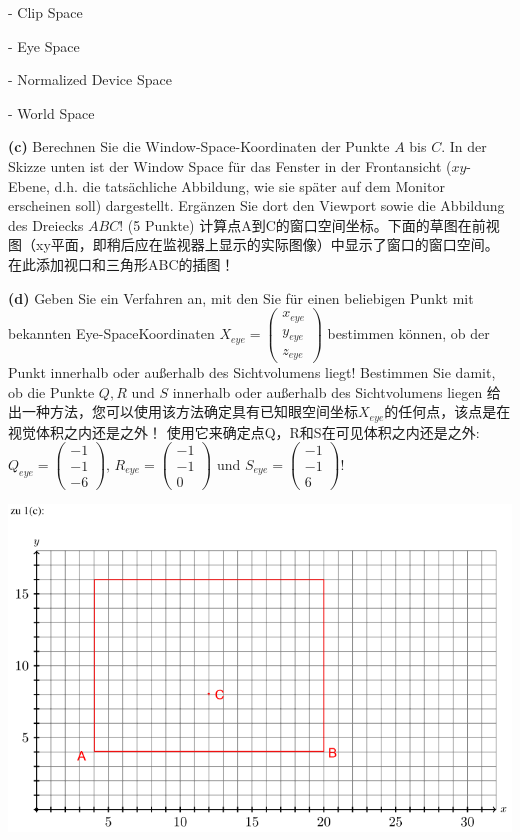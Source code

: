 \documentclass[fleqn]{article}
\begin{document}
\indent\indent - Clip Space 

\indent\indent - Eye Space 

\indent\indent - Normalized Device Space 

\indent\indent - World Space

\indent\textbf{(c)} Berechnen Sie die Window-Space-Koordinaten der Punkte $A$ bis $C$.
 In der Skizze unten ist der Window Space für das Fenster in der Frontansicht ($xy$-Ebene, 
 d.h. die tatsächliche Abbildung, wie sie später auf dem Monitor erscheinen soll) dargestellt. Ergänzen Sie dort den Viewport sowie die Abbildung des Dreiecks $ABC$! (5 Punkte)
 计算点A到C的窗口空间坐标。下面的草图在前视图（xy平面，即稍后应在监视器上显示的实际图像）中显示了窗口的窗口空间。 在此添加视口和三角形ABC的插图！

\indent\textbf{(d)} Geben Sie ein Verfahren an, mit den Sie für einen beliebigen Punkt mit bekannten Eye-SpaceKoordinaten
$X_{eye}=\begin{pmatrix}
    x_{eye}\\y_{eye}\\z_{eye}
\end{pmatrix}$ bestimmen können, ob der Punkt innerhalb oder außerhalb des Sichtvolumens liegt! Bestimmen Sie damit, ob die Punkte $Q, R$ und $S$ innerhalb oder außerhalb des Sichtvolumens
liegen 给出一种方法，您可以使用该方法确定具有已知眼空间坐标$X_{eye}$的任何点，该点是在视觉体积之内还是之外！ 使用它来确定点Q，R和S在可见体积之内还是之外: $Q_{eye}=\begin{pmatrix}
    -1\\-1\\-6
\end{pmatrix},\,R_{eye}=\begin{pmatrix}
    -1\\-1\\0
\end{pmatrix}$ und $S_{eye}=\begin{pmatrix}
    -1\\-1\\6
\end{pmatrix}$!

\begin{center}
    \includegraphics[scale=0.6]{21.png}
\end{center}
\end{document}
